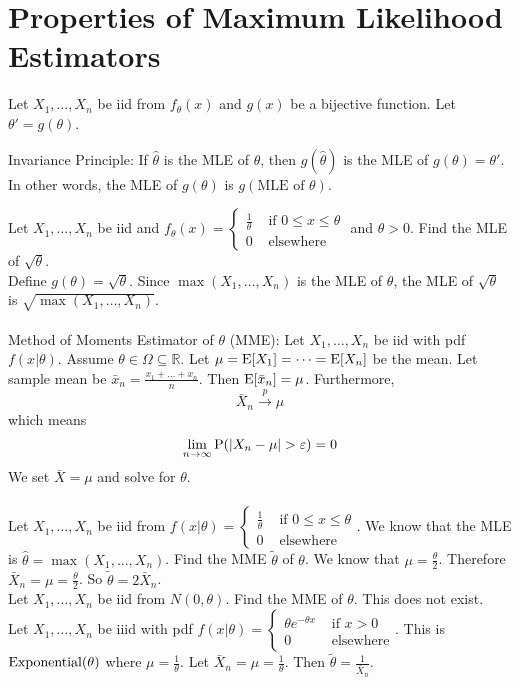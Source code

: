 \documentclass[12pt]{article}
\begin{document}
\section{Properties of Maximum Likelihood Estimators} 
Let $X_1,\dots,X_n$ be iid from $f_\theta(x)$ and $g(x)$ be a bijective function. Let $\theta' = g(\theta)$. 
\begin{theorem} Invariance Principle: If $\hat{\theta}$ is the MLE of $\theta$, then $g(\hat{\theta})$ is the MLE of $g(\theta) = \theta'$. In other words, the MLE of $g(\theta)$ is $g(\text{MLE of } \theta)$. \end{theorem} 
Let $X_1,\dots,X_n$ be iid and $f_\theta(x) = \begin{cases} \frac{1}{\theta} &\text{ if } 0 \leq x \leq \theta \\ 0 &\text{ elsewhere} \end{cases} $ and $\theta > 0$. Find the MLE of $\sqrt{\theta}$. \\ Define $g(\theta) = \sqrt{\theta}$. Since $\max(X_1,\dots,X_n)$ is the MLE of $\theta$, the MLE of $\sqrt{\theta}$ is $\sqrt{\max(X_1,\dots,X_n)}$. \\~\\
Method of Moments Estimator of $\theta$ (MME): Let $X_1,\dots,X_n$ be iid with pdf $f(x|\theta)$. Assume $\theta \in \Omega \subseteq \mathbb{R}$. Let $\mu = \mathrm{E}[ X_1 ] = \dots = \mathrm{E}[ X_n ]$ be the mean. Let sample mean be $\bar{x}_n = \frac{x_1 + \dots + x_n}{n}$. Then $\mathrm{E}[ \bar{x}_n ] = \mu$. Furthermore, $$ \bar{X}_n \stackrel{p}{\to} \mu$$ which means $$\lim_{n\to\infty} \mathrm{P}( |X_n - \mu| > \varepsilon ) = 0 $$ 
We set $\bar{X} = \mu$ and solve for $\theta$. \\~\\
Let $X_1,\dots,X_n$ be iid from $f(x|\theta) = \begin{cases} \frac{1}{\theta} &\text{ if } 0 \leq x \leq \theta \\ 0 &\text{ elsewhere} \end{cases} $. We know that the MLE is $\hat{\theta} = \max(X_1,\dots,X_n)$. Find the MME $\tilde{\theta}$ of $\theta$. We know that $\mu = \frac{\theta}{2}$. Therefore $ \bar{X}_n = \mu = \frac{\theta}{2}$. So $\tilde{\theta} = 2\bar{X}_n $. \\
Let $X_1,\dots,X_n$ be iid from $N(0,\theta)$. Find the MME of $\theta$. This does not exist. \\
Let $X_1,\dots,X_n$ be iiid with pdf $f(x|\theta) = \begin{cases} \theta e^{-\theta x} &\text{ if } x > 0 \\ 0 &\text{ elsewhere} \end{cases} $. This is $\text{Exponential}( \theta )$ where $\mu = \frac{1}{\theta}$. Let $\bar{X}_n = \mu = \frac{1}{\theta}$. Then $\tilde{\theta} = \frac{1}{\bar{X}_n}$. \\
\end{document}
